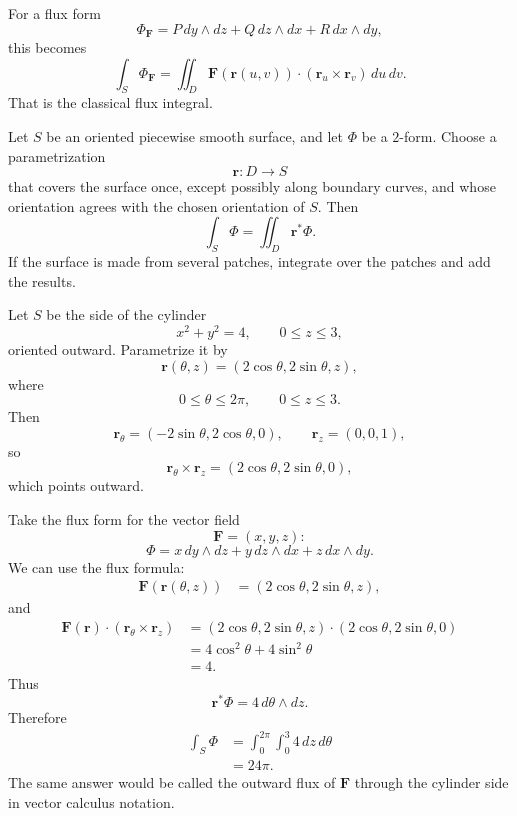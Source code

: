 For a flux form
\[
    \Phi_{\mathbf F}
    =
    P\,dy\wedge dz+Q\,dz\wedge dx+R\,dx\wedge dy,
\]
this becomes
\[
\boxed{
    \int_S\Phi_{\mathbf F}
    =
    \iint_D
    \mathbf F(\mathbf r(u,v))\cdot
    (\mathbf r_u\times\mathbf r_v)\,du\,dv.
}
\]
That is the classical flux integral.

\begin{definition}
Let \(S\) be an oriented piecewise smooth surface, and let \(\Phi\) be a \(2\)-form.
Choose a parametrization
\[
    \mathbf r:D\to S
\]
that covers the surface once, except possibly along boundary curves, and whose
orientation agrees with the chosen orientation of \(S\).  Then
\[
\boxed{
    \int_S\Phi=\iint_D\mathbf r^*\Phi.
}
\]
If the surface is made from several patches, integrate over the patches and add the
results.
\end{definition}

\begin{example}
Let \(S\) be the side of the cylinder
\[
    x^2+y^2=4,
    \qquad
    0\le z\le3,
\]
oriented outward.  Parametrize it by
\[
    \mathbf r(\theta,z)=(2\cos\theta,2\sin\theta,z),
\]
where
\[
    0\le \theta\le2\pi,
    \qquad
    0\le z\le3.
\]
Then
\[
    \mathbf r_\theta=(-2\sin\theta,2\cos\theta,0),
    \qquad
    \mathbf r_z=(0,0,1),
\]
so
\[
    \mathbf r_\theta\times\mathbf r_z
    =
    (2\cos\theta,2\sin\theta,0),
\]
which points outward.

Take the flux form for the vector field
\[
    \mathbf F=(x,y,z):
\]
\[
    \Phi=x\,dy\wedge dz+y\,dz\wedge dx+z\,dx\wedge dy.
\]
We can use the flux formula:
\[
\begin{aligned}
    \mathbf F(\mathbf r(\theta,z))
    &=
    (2\cos\theta,2\sin\theta,z),
\end{aligned}
\]
and
\[
\begin{aligned}
    \mathbf F(\mathbf r)\cdot
    (\mathbf r_\theta\times\mathbf r_z)
    &=
    (2\cos\theta,2\sin\theta,z)
    \cdot
    (2\cos\theta,2\sin\theta,0)\\
    &=
    4\cos^2\theta+4\sin^2\theta\\
    &=
    4.
\end{aligned}
\]
Thus
\[
    \mathbf r^*\Phi=4\,d\theta\wedge dz.
\]
Therefore
\[
\boxed{
\begin{aligned}
    \int_S\Phi
    &=
    \int_0^{2\pi}\int_0^3 4\,dz\,d\theta\\
    &=
    24\pi.
\end{aligned}
}
\]
The same answer would be called the outward flux of \(\mathbf F\) through the cylinder
side in vector calculus notation.
\end{example}

